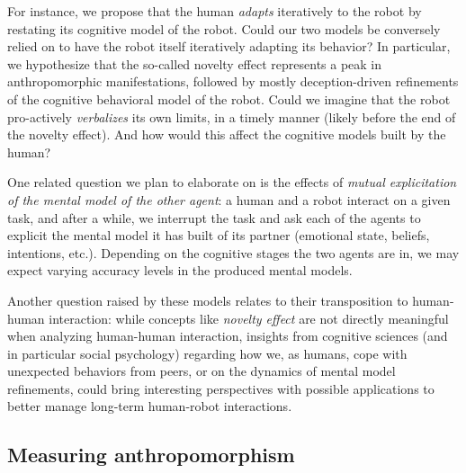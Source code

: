 \documentclass{frontiersSCNS} %
\begin{document}
For instance, we propose that the human \emph{adapts} iteratively to the robot
by restating its cognitive model of the robot. Could our two models be
conversely relied on to have the robot itself iteratively adapting its
behavior? In particular, we hypothesize that the so-called novelty effect
represents a peak in anthropomorphic manifestations, followed by mostly
deception-driven refinements of the cognitive behavioral model of the robot.
Could we imagine that the robot pro-actively \emph{verbalizes} its own limits,
in a timely manner (likely before the end of the novelty effect). And how would
this affect the cognitive models built by the human?

One related question we plan to elaborate on is the effects of \emph{mutual
explicitation of the mental model of the other agent}: a human and a robot
interact on a given task, and after a while, we interrupt the task and ask each
of the agents to explicit the mental model it has built of its partner
(emotional state, beliefs, intentions, etc.). Depending on the cognitive stages
the two agents are in, we may expect varying accuracy levels in the produced
mental models.

Another question raised by these models relates to their transposition to
human-human interaction: while concepts like \emph{novelty effect} are not
directly meaningful when analyzing human-human interaction, insights from
cognitive sciences (and in particular social psychology) regarding how we, as
humans, cope with unexpected behaviors from peers, or on the dynamics of mental
model refinements, could bring interesting perspectives with possible
applications to better manage long-term human-robot interactions.

\subsection{Measuring anthropomorphism}
\label{sec:measuring}


\citep{ruijten_introducing_2014}
\end{document}
